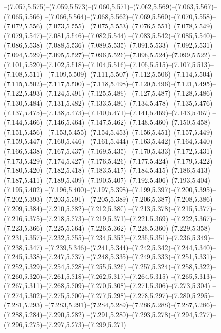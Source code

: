   --(7.057,5.575)--(7.059,5.573)--(7.060,5.571)--(7.062,5.569)--(7.063,5.567)--(7.065,5.566)%
  --(7.066,5.564)--(7.068,5.562)--(7.069,5.560)--(7.070,5.558)--(7.072,5.556)--(7.073,5.555)%
  --(7.075,5.553)--(7.076,5.551)--(7.078,5.549)--(7.079,5.547)--(7.081,5.546)--(7.082,5.544)%
  --(7.083,5.542)--(7.085,5.540)--(7.086,5.538)--(7.088,5.536)--(7.089,5.535)--(7.091,5.533)%
  --(7.092,5.531)--(7.094,5.529)--(7.095,5.527)--(7.096,5.526)--(7.098,5.524)--(7.099,5.522)%
  --(7.101,5.520)--(7.102,5.518)--(7.104,5.516)--(7.105,5.515)--(7.107,5.513)--(7.108,5.511)%
  --(7.109,5.509)--(7.111,5.507)--(7.112,5.506)--(7.114,5.504)--(7.115,5.502)--(7.117,5.500)%
  --(7.118,5.498)--(7.120,5.496)--(7.121,5.495)--(7.122,5.493)--(7.124,5.491)--(7.125,5.489)%
  --(7.127,5.487)--(7.128,5.486)--(7.130,5.484)--(7.131,5.482)--(7.133,5.480)--(7.134,5.478)%
  --(7.135,5.476)--(7.137,5.475)--(7.138,5.473)--(7.140,5.471)--(7.141,5.469)--(7.143,5.467)%
  --(7.144,5.466)--(7.146,5.464)--(7.147,5.462)--(7.148,5.460)--(7.150,5.458)--(7.151,5.456)%
  --(7.153,5.455)--(7.154,5.453)--(7.156,5.451)--(7.157,5.449)--(7.159,5.447)--(7.160,5.446)%
  --(7.161,5.444)--(7.163,5.442)--(7.164,5.440)--(7.166,5.438)--(7.167,5.437)--(7.169,5.435)%
  --(7.170,5.433)--(7.172,5.431)--(7.173,5.429)--(7.174,5.427)--(7.176,5.426)--(7.177,5.424)%
  --(7.179,5.422)--(7.180,5.420)--(7.182,5.418)--(7.183,5.417)--(7.184,5.415)--(7.186,5.413)%
  --(7.187,5.411)--(7.189,5.409)--(7.190,5.407)--(7.192,5.406)--(7.193,5.404)--(7.195,5.402)%
  --(7.196,5.400)--(7.197,5.398)--(7.199,5.397)--(7.200,5.395)--(7.202,5.393)--(7.203,5.391)%
  --(7.205,5.389)--(7.206,5.387)--(7.208,5.386)--(7.209,5.384)--(7.210,5.382)--(7.212,5.380)%
  --(7.213,5.378)--(7.215,5.377)--(7.216,5.375)--(7.218,5.373)--(7.219,5.371)--(7.221,5.369)%
  --(7.222,5.367)--(7.223,5.366)--(7.225,5.364)--(7.226,5.362)--(7.228,5.360)--(7.229,5.358)%
  --(7.231,5.357)--(7.232,5.355)--(7.234,5.353)--(7.235,5.351)--(7.236,5.349)--(7.238,5.347)%
  --(7.239,5.346)--(7.241,5.344)--(7.242,5.342)--(7.244,5.340)--(7.245,5.338)--(7.247,5.337)%
  --(7.248,5.335)--(7.249,5.333)--(7.251,5.331)--(7.252,5.329)--(7.254,5.328)--(7.255,5.326)%
  --(7.257,5.324)--(7.258,5.322)--(7.260,5.320)--(7.261,5.318)--(7.262,5.317)--(7.264,5.315)%
  --(7.265,5.313)--(7.267,5.311)--(7.268,5.309)--(7.270,5.308)--(7.271,5.306)--(7.273,5.304)%
  --(7.274,5.302)--(7.275,5.300)--(7.277,5.298)--(7.278,5.297)--(7.280,5.295)--(7.281,5.293)%
  --(7.283,5.291)--(7.284,5.289)--(7.286,5.288)--(7.287,5.286)--(7.288,5.284)--(7.290,5.282)%
  --(7.291,5.280)--(7.293,5.278)--(7.294,5.277)--(7.296,5.275)--(7.297,5.273)--(7.299,5.271)%
